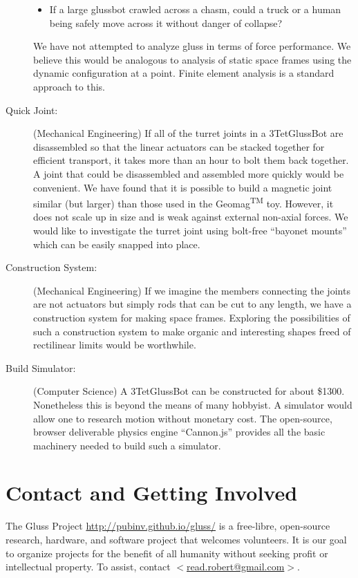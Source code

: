 \documentclass[11pt]{article}
\begin{document}
\begin{description}
\begin{itemize}
\item If a large glussbot crawled across a chasm, could a truck or a human being safely move
  across it without danger of collapse?
\end{itemize}
We have not attempted to analyze gluss in terms of force performance. We believe this would
be analogous to analysis of static space frames using the dynamic configuration at a point.
Finite element analysis is a standard approach to this.
\item [Quick Joint:] (Mechanical Engineering) If all of the turret joints in a 3TetGlussBot are disassembled so that
  the linear actuators can be stacked together for efficient transport, it takes more than an hour
  to bolt them back together.
  A joint that could be
  disassembled and assembled more quickly would be convenient.
  We have found that it is possible to build a magnetic
  joint similar (but larger) than those used in the Geomag\textsuperscript{TM} toy. However, it does not scale up in size
  and is weak against external non-axial forces. We would like to investigate the turret joint using bolt-free ``bayonet mounts'' which
  can be easily snapped into place.
\item [Construction System:] (Mechanical Engineering) If we imagine the members connecting the joints are not actuators but
  simply rods that can be cut to any length, we have a construction system for making space frames.
  Exploring the possibilities of such a construction system to make organic and interesting shapes
  freed of rectilinear limits would be worthwhile.
\item [Build Simulator:] (Computer Science) A 3TetGlussBot can be constructed for about \$1300. Nonetheless this
  is beyond the means of many hobbyist. A simulator would allow one to research 
  motion without monetary cost. The open-source, browser deliverable physics engine ``Cannon.js''
  provides all the basic machinery needed to build such a simulator.
\end{description}


\section{Contact and Getting Involved}

The Gluss Project \url{http://pubinv.github.io/gluss/}
is a free-libre, open-source research, hardware, and software project that welcomes volunteers.
It is our goal to organize projects for the benefit of all humanity without seeking profit or intellectual property.
To assist, contact \href{mailto:read.robert@gmail.com}{$<$read.robert@gmail.com$>$}.
\end{document}
